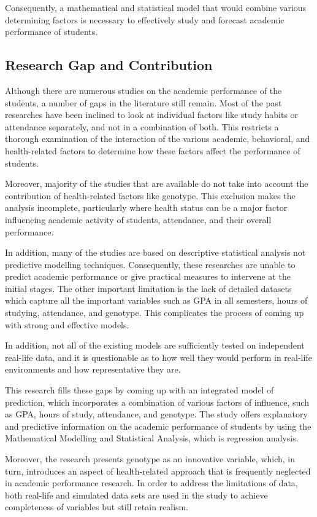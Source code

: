 \documentclass[12pt]{report}
\begin{document}
	Consequently, a mathematical and statistical model that would combine various determining factors is necessary to effectively study and forecast academic performance of students.
	
	\subsection{Research Gap and Contribution}
	Although there are numerous studies on the academic performance of the students, a number of gaps in the literature still remain. Most of the past researches have been inclined to look at individual factors like study habits or attendance separately, and not in a combination of both. This restricts a thorough examination of the interaction of the various academic, behavioral, and health-related factors to determine how these factors affect the performance of students.
	
	Moreover, majority of the studies that are available do not take into account the contribution of health-related factors like genotype. This exclusion makes the analysis incomplete, particularly where health status can be a major factor influencing academic activity of students, attendance, and their overall performance.
	
	In addition, many of the studies are based on descriptive statistical analysis not predictive modelling techniques. Consequently, these researches are unable to predict academic performance or give practical measures to intervene at the initial stages. The other important limitation is the lack of detailed datasets which capture all the important variables such as GPA in all semesters, hours of studying, attendance, and genotype. This complicates the process of coming up with strong and effective models.
	
	In addition, not all of the existing models are sufficiently tested on independent real-life data, and it is questionable as to how well they would perform in real-life environments and how representative they are.
	
	This research fills these gaps by coming up with an integrated model of prediction, which incorporates a combination of various factors of influence, such as GPA, hours of study, attendance, and genotype. The study offers explanatory and predictive information on the academic performance of students by using the Mathematical Modelling and Statistical Analysis, which is regression analysis.
	
	Moreover, the research presents genotype as an innovative variable, which, in turn, introduces an aspect of health-related approach that is frequently neglected in academic performance research. In order to address the limitations of data, both real-life and simulated data sets are used in the study to achieve completeness of variables but still retain realism.
	
\end{document}
